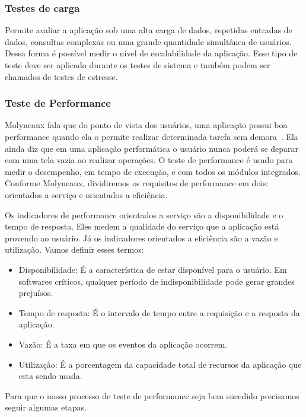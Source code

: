 \subsubsection{Testes de carga}

Permite avaliar a aplicação sob uma alta carga de dados, repetidas entradas de dados, consultas complexas ou uma grande quantidade simultânea de usuários. Dessa forma é possível medir o nível de escalabilidade da aplicação. Esse tipo de teste deve ser aplicado durante os testes de sistema e também podem ser chamados de testes de estresse.


\subsubsection{Teste de Performance}

Molyneaux fala que do ponto de vista dos usuários, uma aplicação possui boa performance quando ela o permite realizar determinada tarefa sem demora~\cite{theartoftestperf}. Ela ainda diz que em uma aplicação performática o usuário nunca poderá se deparar com uma tela vazia ao realizar operações. O teste de performance é usado para medir o desempenho, em tempo de execução, e com todos os módulos integrados. Conforme Molyneaux, dividiremos os requisitos de performance em dois: orientados a serviço e orientados a eficiência.%

Os indicadores de performance orientados a serviço são a disponibilidade e o tempo de resposta. Eles medem a qualidade do serviço que a aplicação está provendo ao usuário. Já os indicadores orientados a eficiência são a vazão e utilização. Vamos definir esses termos:

\begin{itemize}
\item Disponibilidade: É a característica de estar disponível para o usuário. Em softwares críticos, qualquer período de indisponibilidade pode gerar grandes prejuísos.
\item Tempo de resposta: É o intervalo de tempo entre a requisição e a resposta da aplicação. 
\item Vazão: É a taxa em que os eventos da aplicação ocorrem.
\item Utilização: É a porcentagem da capacidade total de recursos da aplicação que esta sendo usada.
\end{itemize}

Para que o nosso processo de teste de performance seja bem sucedido precisamos seguir algumas etapas.

